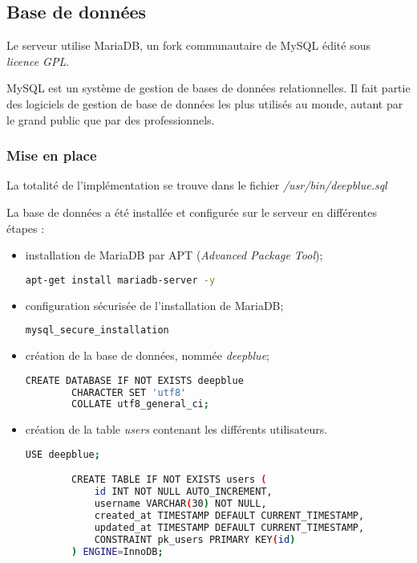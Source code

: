 \subsection{Base de données}
\label{subsec:bd}

Le serveur utilise MariaDB, un fork communautaire de MySQL édité sous \\
\emph{licence GPL}.

MySQL est un système de gestion de bases de données relationnelles. Il fait
partie des logiciels de gestion de base de données les plus utilisés au monde,
autant par le grand public que par des professionnels.

\subsubsection{Mise en place}
\label{subsubsec:mise-en-place}

La totalité de l'implémentation se trouve dans le fichier
\textit{/usr/bin/deepblue.sql}

La base de données a été installée et configurée sur le serveur en différentes
étapes :
\begin{itemize}
\item installation de MariaDB par APT
  (\emph{Advanced Package Tool});

  \begin{lstlisting}[language=bash]
    apt-get install mariadb-server -y
  \end{lstlisting}

\item configuration sécurisée de l'installation de MariaDB;

  \begin{lstlisting}[language=bash]
    mysql_secure_installation
  \end{lstlisting}

\item création de la base de données, nommée \emph{deepblue};

  \begin{lstlisting}[language=bash]
        CREATE DATABASE IF NOT EXISTS deepblue
        CHARACTER SET 'utf8'
        COLLATE utf8_general_ci;
      \end{lstlisting}

    \item création de la table \og \textit{users} \fg contenant les
      différents utilisateurs.

      \begin{lstlisting}[language=bash]
        USE deepblue;

        CREATE TABLE IF NOT EXISTS users (
            id INT NOT NULL AUTO_INCREMENT,
            username VARCHAR(30) NOT NULL,
            created_at TIMESTAMP DEFAULT CURRENT_TIMESTAMP,
            updated_at TIMESTAMP DEFAULT CURRENT_TIMESTAMP,
            CONSTRAINT pk_users PRIMARY KEY(id)
        ) ENGINE=InnoDB;
      \end{lstlisting}
\end{itemize}

